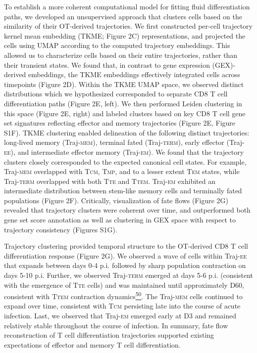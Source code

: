 To establish a more coherent computational model for fitting fluid
differentiation paths, we developed an unsupervised approach that
clusters cells based on the similarity of their OT-derived trajectories.
We first constructed per-cell trajectory kernel mean embedding (TKME;
Figure 2C) representations, and projected the cells using UMAP according
to the computed trajectory embeddings. This allowed us to characterize
cells based on their entire trajectories, rather than their transient
states. We found that, in contrast to gene expression (GEX)-derived
embeddings, the TKME embeddings effectively integrated cells across
timepoints (Figure 2D). Within the TKME UMAP space, we observed distinct
distributions which we hypothesized corresponded to separate CD8 T cell
differentiation paths (Figure 2E, left). We then performed Leiden
clustering in this space (Figure 2E, right) and labeled clusters based
on key CD8 T cell gene set signatures reflecting effector and memory
trajectories (Figure 2E, Figure S1F). TKME clustering enabled
delineation of the following distinct trajectories: long-lived memory
(Traj-\textsc{mem}), terminal fated (Traj-\textsc{term}), early effector
(Traj-\textsc{ee)}, and intermediate effector memory (Traj-\textsc{em).}
We found that the trajectory clusters closely corresponded to the
expected canonical cell states. For example, Traj-\textsc{mem}
overlapped with T\textsc{cm}, T\textsc{mp}, and to a lesser extent
T\textsc{em} states, while Traj-\textsc{term} overlapped with both
T\textsc{te} and T\textsc{tem}. Traj-\textsc{em} exhibited an
intermediate distribution between stem-like memory cells and terminally
fated populations (Figure 2F). Critically, visualization of fate flows
(Figure 2G) revealed that trajectory clusters were coherent over time,
and outperformed both gene set score annotation as well as clustering in
GEX space with respect to trajectory consistency (Figures S1G).

Trajectory clustering provided temporal structure to the OT-derived CD8
T cell differentiation response (Figure 2G). We observed a wave of cells
within Traj-\textsc{ee} that expands between days 0-4 p.i. followed by
sharp population contraction on days 5-10 p.i. Further, we observed
Traj-\textsc{term} emerged at days 5-6 p.i. (consistent with the
emergence of T\textsc{te} cells) and was maintained until approximately
D60, consistent with T\textsc{tem} contraction
dynamics\href{https://sciwheel.com/work/citation?ids=9725107\&pre=\&suf=\&sa=0\&dbf=0}{\textsuperscript{50}}.
The Traj-\textsc{mem} cells continued to expand over time, consistent
with T\textsc{cm} persisting late into the course of acute infection.
Last, we observed that Traj-\textsc{em} emerged early at D3 and remained
relatively stable throughout the course of infection. In summary, fate
flow reconstruction of T cell differentiation trajectories supported
existing expectations of effector and memory T cell differentiation.

